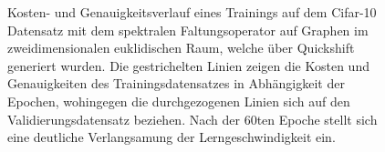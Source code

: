 \begin{figure}[t]
\caption[\gls{Cifar}-10 Kosten- und Genauigkeitsverlauf]{Kosten- und Genauigkeitsverlauf eines Trainings auf dem \gls{Cifar}-10 Datensatz mit dem spektralen Faltungsoperator auf Graphen im zweidimensionalen euklidischen Raum, welche über Quickshift generiert wurden.
Die gestrichelten Linien zeigen die Kosten und Genauigkeiten des Trainingsdatensatzes in Abhängigkeit der Epochen, wohingegen die durchgezogenen Linien sich auf den Validierungsdatensatz beziehen.
Nach der $60$ten Epoche stellt sich eine deutliche Verlangsamung der Lerngeschwindigkeit ein.}
\label{fig:cifar_10_train}
\end{figure}
